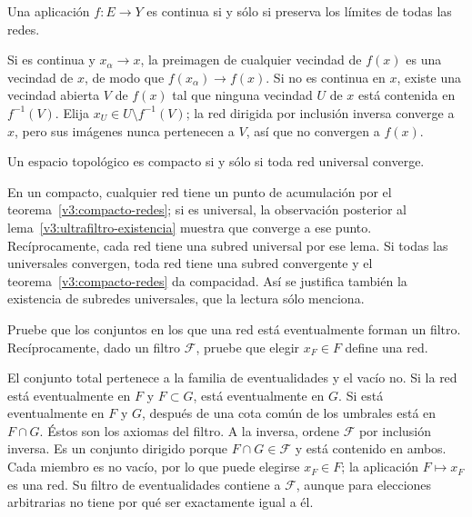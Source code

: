 \begin{ejercicio}\label{ej:v3-l14-3}
Una aplicación $f:E\to Y$ es continua si y sólo si preserva los límites de todas las redes.
\end{ejercicio}
\begin{solucion}
Si es continua y $x_\alpha\to x$, la preimagen de cualquier vecindad de $f(x)$ es una vecindad de $x$, de modo que $f(x_\alpha)\to f(x)$. Si no es continua en $x$, existe una vecindad abierta $V$ de $f(x)$ tal que ninguna vecindad $U$ de $x$ está contenida en $f^{-1}(V)$. Elija $x_U\in U\setminus f^{-1}(V)$; la red dirigida por inclusión inversa converge a $x$, pero sus imágenes nunca pertenecen a $V$, así que no convergen a $f(x)$.
\end{solucion}

\begin{ejercicio}\label{ej:v3-l14-4}
Un espacio topológico es compacto si y sólo si toda red universal converge.
\end{ejercicio}
\begin{solucion}
En un compacto, cualquier red tiene un punto de acumulación por el teorema~\ref{v3:compacto-redes}; si es universal, la observación posterior al lema~\ref{v3:ultrafiltro-existencia} muestra que converge a ese punto. Recíprocamente, cada red tiene una subred universal por ese lema. Si todas las universales convergen, toda red tiene una subred convergente y el teorema~\ref{v3:compacto-redes} da compacidad. Así se justifica también la existencia de subredes universales, que la lectura sólo menciona.
\end{solucion}

\begin{ejercicio}\label{ej:v3-l14-5}
Pruebe que los conjuntos en los que una red está eventualmente forman un filtro. Recíprocamente, dado un filtro $\mathcal F$, pruebe que elegir $x_F\in F$ define una red.
\end{ejercicio}
\begin{solucion}
El conjunto total pertenece a la familia de eventualidades y el vacío no. Si la red está eventualmente en $F$ y $F\subset G$, está eventualmente en $G$. Si está eventualmente en $F$ y $G$, después de una cota común de los umbrales está en $F\cap G$. Éstos son los axiomas del filtro. A la inversa, ordene $\mathcal F$ por inclusión inversa. Es un conjunto dirigido porque $F\cap G\in\mathcal F$ y está contenido en ambos. Cada miembro es no vacío, por lo que puede elegirse $x_F\in F$; la aplicación $F\mapsto x_F$ es una red. Su filtro de eventualidades contiene a $\mathcal F$, aunque para elecciones arbitrarias no tiene por qué ser exactamente igual a él.
\end{solucion}


